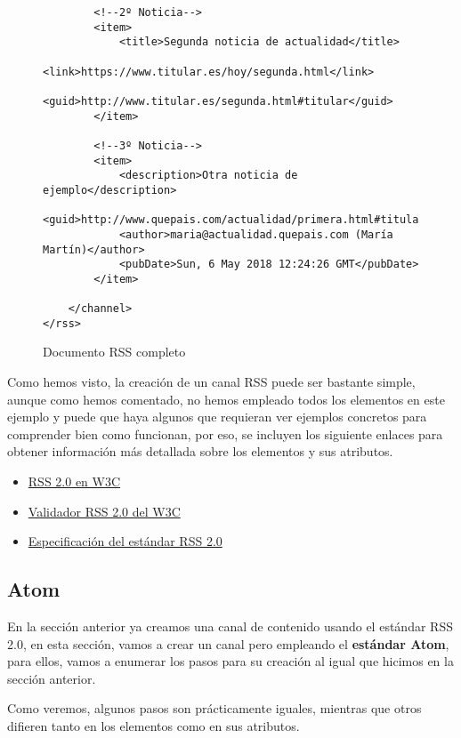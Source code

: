\begin{enumerate}
\begin{figure}[H]
\begin{tcolorbox}[sharp corners, colback=yellow!30, colframe=white!20]
\begin{verbatim}
        <!--2º Noticia-->
        <item>
            <title>Segunda noticia de actualidad</title>
            <link>https://www.titular.es/hoy/segunda.html</link>
            <guid>http://www.titular.es/segunda.html#titular</guid>
        </item>

        <!--3º Noticia-->
        <item>
            <description>Otra noticia de ejemplo</description>
            <guid>http://www.quepais.com/actualidad/primera.html#titular</guid>
            <author>maria@actualidad.quepais.com (María Martín)</author>
            <pubDate>Sun, 6 May 2018 12:24:26 GMT</pubDate>
        </item>

    </channel>
</rss>
            \end{verbatim}
        \end{tcolorbox}
        \caption{Documento RSS completo}
    \end{figure}
\end{enumerate}

Como hemos visto, la creación de un canal RSS puede ser bastante simple, aunque como hemos comentado, no hemos empleado todos los elementos en este ejemplo y puede que haya algunos que requieran ver ejemplos concretos para comprender bien como funcionan, por eso, se incluyen los siguiente enlaces para obtener información más detallada sobre los elementos y sus atributos.

\begin{itemize}
    \item \href{https://validator.w3.org/feed/docs/rss2.html}{RSS 2.0 en W3C}
    \item \href{https://validator.w3.org/feed/#validate_by_input}{Validador RSS 2.0 del W3C}
    \item \href{https://cyber.harvard.edu/rss/rss.html}{Especificación del estándar RSS 2.0}
\end{itemize}

\subsection{Atom}
En la sección anterior ya creamos una canal de contenido usando el estándar RSS 2.0, en esta sección, vamos a crear un canal pero empleando el \textbf{estándar Atom}, para ellos, vamos a enumerar los pasos para su creación al igual que hicimos en la sección anterior.

Como veremos, algunos pasos son prácticamente iguales, mientras que otros difieren tanto en los elementos como en sus atributos.


